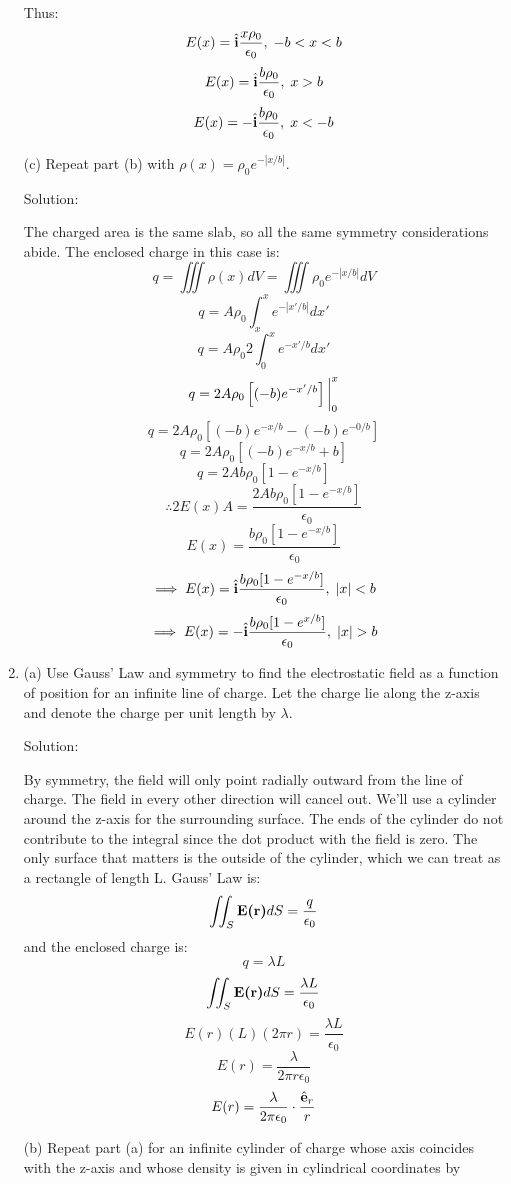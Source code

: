 \documentclass{article}
\begin{document}
\begin{enumerate}
    Thus:
    \[ E(x) = \hat{\textbf{i}} \frac{x\rho_0}{\epsilon_0}, \; -b < x < b \]
    \[ E(x) = \hat{\textbf{i}} \frac{b\rho_0}{\epsilon_0}, \; x > b \]
    \[ E(x) = -\hat{\textbf{i}} \frac{b\rho_0}{\epsilon_0}, \; x < -b \]

    (c) Repeat part (b) with $\rho(x) = \rho_0e^{-|x/b|}$.

    Solution:

    The charged area is the same slab, so all the same symmetry considerations abide. The enclosed charge in this case
    is:
    \[ q = \iiint \rho(x) dV = \iiint \rho_0 e^{-|x/b|} dV \]
    \[ q = A\rho_0 \int_x^x e^{-|x'/b|} dx' \]
    \[ q = A\rho_0 2 \int_0^x e^{-x'/b} dx' \]
    \[ q = 2A\rho_0 \left[ (-b)e^{-x'/b} \right] \bigg{|}_0^x \]
    \[ q = 2A\rho_0 [(-b)e^{-x/b} -(-b)e^{-0/b}]\]
    \[ q = 2A\rho_0 [(-b)e^{-x/b} + b]\]
    \[ q = 2Ab\rho_0 [1 - e^{-x/b}]\]
    \[ \therefore 2E(x)A = \frac{2Ab\rho_0 [1 - e^{-x/b}]}{\epsilon_0} \]
    \[ E(x) = \frac{b\rho_0 [1 - e^{-x/b}]}{\epsilon_0} \]
    \[ \implies E(x) = \hat{\textbf{i}}\frac{b\rho_0 [1 - e^{-x/b}]}{\epsilon_0}, \; |x| < b \]
    \[ \implies E(x) = -\hat{\textbf{i}}\frac{b\rho_0 [1 - e^{x/b}]}{\epsilon_0}, \; |x| > b \]

    \item (a) Use Gauss' Law and symmetry to find the electrostatic field as a function of position for an infinite
    line of charge. Let the charge lie along the z-axis and denote the charge per unit length by $\lambda$.

    Solution:

    By symmetry, the field will only point radially outward from the line of charge. The field in every other direction will
    cancel out. We'll use a cylinder around the z-axis for the surrounding surface. The ends of the cylinder do not contribute
    to the integral since the dot product with the field is zero. The only surface that matters is the outside of the cylinder,
    which we can treat as a rectangle of length L. Gauss' Law is:
    \[ \iint_S \textbf{E(r)} dS = \frac{q}{\epsilon_0} \]
    and the enclosed charge is:
    \[ q = \lambda L \]
    \[ \iint_S \textbf{E(r)} dS = \frac{\lambda L}{\epsilon_0} \]
    \[ E(r) (L)(2\pi r) = \frac{\lambda L}{\epsilon_0} \]
    \[ E(r) = \frac{\lambda}{2\pi r \epsilon_0} \]
    \[ E(r) = \frac{\lambda}{2\pi\epsilon_0} \cdot \frac{\hat{\textbf{e}}_r}{r} \]

    (b) Repeat part (a) for an infinite cylinder of charge whose axis coincides with the z-axis and whose density is given
    in cylindrical coordinates by


\end{enumerate}
\end{document}
